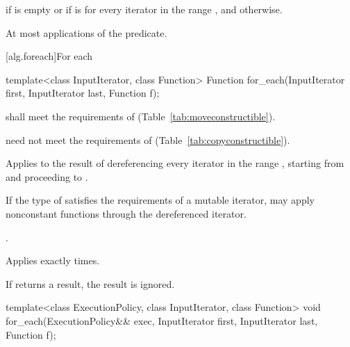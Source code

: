 \begin{itemdescr}
\pnum
\returns {} if
 is empty or if
 is  for every iterator  in the range , and  otherwise.

\pnum
\complexity At most  applications of the predicate.
\end{itemdescr}

[alg.foreach]{For each}

%
\begin{itemdecl}
template<class InputIterator, class Function>
  Function for_each(InputIterator first, InputIterator last, Function f);
\end{itemdecl}

\begin{itemdescr}
\pnum
\requires {} shall meet the requirements of
 (Table~\ref{tab:moveconstructible}).
\begin{note}  need not meet the requirements of
 (Table~\ref{tab:copyconstructible}). \end{note}

\pnum
\effects
Applies
 to the result of dereferencing every iterator in the range
,
starting from
and proceeding to
.
\begin{note} If the type of  satisfies the
requirements of a mutable iterator,  may apply nonconstant
functions through the dereferenced iterator.\end{note}

\pnum
\returns
{}.

\pnum
\complexity
Applies 
exactly
times.

\pnum
\remarks
If  returns a result, the result is ignored.
\end{itemdescr}

%
\begin{itemdecl}
template<class ExecutionPolicy, class InputIterator, class Function>
  void for_each(ExecutionPolicy&& exec,
                InputIterator first, InputIterator last,
                Function f);
\end{itemdecl}

